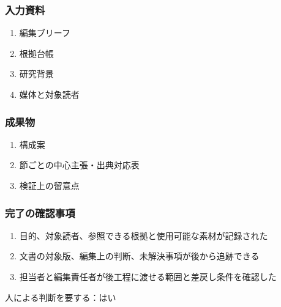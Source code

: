 \documentclass[a4paper,11pt]{article}
\begin{document}
\subsubsection*{入力資料}
\begin{enumerate}[leftmargin=2em,itemsep=0.35em]
\item 編集ブリーフ
\item 根拠台帳
\item 研究背景
\item 媒体と対象読者
\end{enumerate}
\subsubsection*{成果物}
\begin{enumerate}[leftmargin=2em,itemsep=0.35em]
\item 構成案
\item 節ごとの中心主張・出典対応表
\item 検証上の留意点
\end{enumerate}
\subsubsection*{完了の確認事項}
\begin{enumerate}[leftmargin=2em,itemsep=0.35em]
\item 目的、対象読者、参照できる根拠と使用可能な素材が記録された
\item 文書の対象版、編集上の判断、未解決事項が後から追跡できる
\item 担当者と編集責任者が後工程に渡せる範囲と差戻し条件を確認した
\end{enumerate}
\par 人による判断を要する：はい\par\medskip
\end{document}

